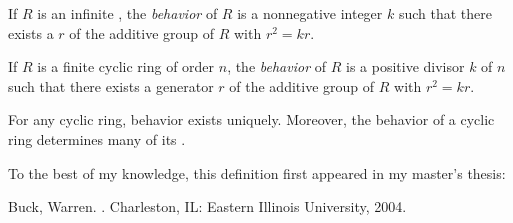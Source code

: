 \documentclass[12pt]{article}
\begin{document}
If $R$ is an infinite , the {\sl behavior\/} of $R$ is a nonnegative integer $k$ such that there exists a  $r$ of the additive group of $R$ with $r^2=kr$.

If $R$ is a finite cyclic ring of order $n$, the {\sl behavior\/} of $R$ is a positive divisor $k$ of $n$ such that there exists a generator $r$ of the additive group of $R$ with $r^2=kr$.

For any cyclic ring, behavior exists uniquely.  Moreover, the behavior of a cyclic ring determines many of its . 

To the best of my knowledge, this definition first appeared in my master's thesis:

Buck, Warren.  \emph{}.  Charleston, IL: Eastern Illinois University, 2004.
\end{document}
